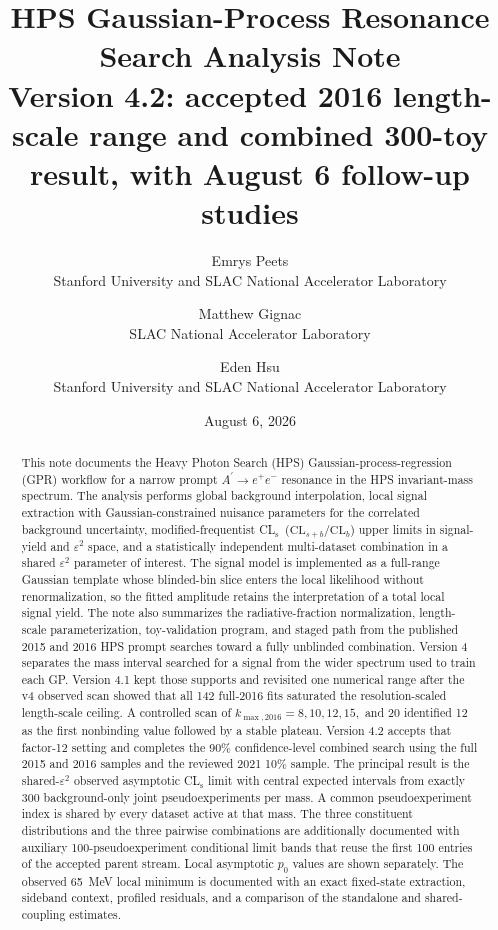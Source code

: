 \documentclass[11pt]{article}
\title{\vspace{-1.0em}HPS Gaussian-Process Resonance Search Analysis Note\\
\large Version 4.2: accepted 2016 length-scale range and
combined 300-toy result, with August 6 follow-up studies}
\author{
Emrys Peets\\Stanford University and SLAC National Accelerator Laboratory
\and
Matthew Gignac\\SLAC National Accelerator Laboratory
\and
Eden Hsu\\Stanford University and SLAC National Accelerator Laboratory
}
\date{August 6, 2026}
\newcommand{\eps}{\varepsilon}
\newcommand{\CLs}{CL$_\mathrm{s}$}
\begin{document}
\maketitle

\begin{abstract}
This note documents the Heavy Photon Search (HPS) Gaussian-process-regression (GPR)
workflow for a narrow prompt
$A^\prime \rightarrow e^+e^-$ resonance in the HPS invariant-mass spectrum. The
analysis performs global background interpolation, local signal extraction with
Gaussian-constrained nuisance parameters for the correlated background uncertainty,
modified-frequentist
\CLs\ ($\mathrm{CL}_{s+b}/\mathrm{CL}_b$) upper limits in signal-yield and
$\eps^2$ space, and a statistically independent multi-dataset combination in a shared
$\eps^2$ parameter of interest. The signal model is implemented as a full-range
Gaussian template whose blinded-bin slice enters the local likelihood without
renormalization, so the fitted amplitude retains the interpretation of a total local
signal yield. The note also summarizes the radiative-fraction normalization,
length-scale parameterization, toy-validation program, and staged path from the
published 2015 and 2016 HPS prompt searches toward a fully unblinded combination.
Version 4 separates the mass interval searched for a signal from the wider spectrum
used to train each GP. Version 4.1 kept those supports and revisited one numerical
range after the v4 observed scan showed that all 142 full-2016 fits saturated the
resolution-scaled length-scale ceiling. A controlled scan of
$k_{\max,2016}=8,10,12,15,$ and 20 identified 12 as the first nonbinding value
followed by a stable plateau. Version 4.2 accepts that factor-12 setting and completes
the 90\% confidence-level combined search using the full 2015 and 2016 samples and
the reviewed 2021 10\% sample. The principal result is the shared-$\eps^2$ observed
asymptotic \CLs{} limit with central expected intervals from exactly 300
background-only joint pseudoexperiments per mass. A common pseudoexperiment index is
shared by every dataset active at that mass. The three constituent distributions
and the three pairwise combinations are additionally documented with auxiliary
100-pseudoexperiment conditional limit bands that reuse the first 100 entries of
the accepted parent stream. Local asymptotic $p_0$ values are shown separately.
The observed 65~MeV local minimum is
documented with an exact fixed-state extraction, sideband context, profiled
residuals, and a comparison of the standalone and shared-coupling estimates.

\end{abstract}
\end{document}
